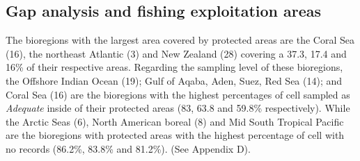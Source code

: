 \documentclass[12pt,authoryear]{elsarticle}
\begin{document}
\subsection{Gap analysis and fishing exploitation areas}
\label{sec:GAP}

The bioregions with the largest area covered by protected areas are the Coral Sea (16), the northeast Atlantic (3) and New Zealand (28) covering a 37.3, 17.4 and 16\% of their respective areas.
Regarding the sampling level of these bioregions, the Offshore Indian Ocean (19); Gulf of Aqaba, Aden, Suez, Red Sea (14); and Coral Sea (16) are the bioregions with the highest percentages of cell sampled as \textit{Adequate}
inside of their protected areas (83, 63.8 and 59.8\% respectively).
While the Arctic Seas (6), North American boreal (8) and Mid South Tropical Pacific are the bioregions with protected areas with the highest percentage of cell with no records (86.2\%, 83.8\% and 81.2\%).
(See Appendix D).
\end{document}
